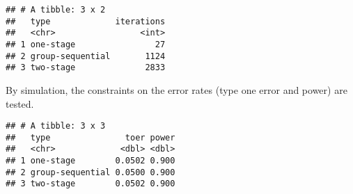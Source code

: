 \documentclass[]{book}
\newenvironment{Shaded}{\begin{snugshade}}{\end{snugshade}}
\newcommand{\DataTypeTok}[1]{\textcolor[rgb]{0.13,0.29,0.53}{#1}}
\newcommand{\DecValTok}[1]{\textcolor[rgb]{0.00,0.00,0.81}{#1}}
\newcommand{\FloatTok}[1]{\textcolor[rgb]{0.00,0.00,0.81}{#1}}
\newcommand{\KeywordTok}[1]{\textcolor[rgb]{0.13,0.29,0.53}{\textbf{#1}}}
\newcommand{\NormalTok}[1]{#1}
\newcommand{\OperatorTok}[1]{\textcolor[rgb]{0.81,0.36,0.00}{\textbf{#1}}}
\newcommand{\StringTok}[1]{\textcolor[rgb]{0.31,0.60,0.02}{#1}}
\begin{document}
\begin{verbatim}
## # A tibble: 3 x 2
##   type             iterations
##   <chr>                 <int>
## 1 one-stage                27
## 2 group-sequential       1124
## 3 two-stage              2833
\end{verbatim}

By simulation, the constraints on the error rates (type one error and power)
are tested.

\begin{Shaded}
\end{Shaded}

\begin{verbatim}
## # A tibble: 3 x 3
##   type               toer power
##   <chr>             <dbl> <dbl>
## 1 one-stage        0.0502 0.900
## 2 group-sequential 0.0500 0.900
## 3 two-stage        0.0502 0.900
\end{verbatim}
\end{document}
